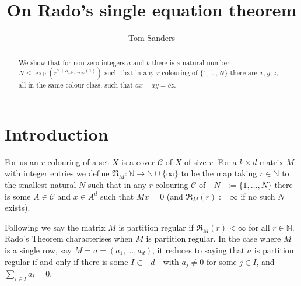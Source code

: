 \documentclass[12pt,reqno]{amsart}
\providecommand{\N}{\mathbb{N}}
\numberwithin{equation}{section}
\begin{document}
\title{On Rado's single equation theorem}

\author{Tom Sanders}
\address{Mathematical Institute\\
University of Oxford\\
Radcliffe Observatory Quarter\\
Woodstock Road\\
Oxford OX2 6GG\\
United Kingdom}

\begin{abstract}
We show that for non-zero integers $a$ and $b$ there is a natural number $N \leq \exp(r^{2+o_{a,b;r\rightarrow \infty}(1)})$ such that in any $r$-colouring of $\{1,\dots,N\}$ there are $x,y,z$, all in the same colour class, such that $ax-ay=bz$. 
\end{abstract}

\maketitle

\section{Introduction}\label{sec.intro}

For us an $r$-colouring of a set $X$ is a cover $\mathcal{C}$ of $X$ of size $r$.  For a $k \times d$ matrix $M$ with integer entries we define $\mathfrak{R}_M:\N \rightarrow \N \cup \{\infty\}$ to be the map taking $r \in \N$ to the smallest natural $N$ such that in any $r$-colouring $\mathcal{C}$ of $[N]:=\{1,\dots,N\}$ there is some $A \in \mathcal{C}$ and $x \in A^d$ such that $Mx=0$ (and $\mathfrak{R}_M(r):=\infty$ if no such $N$ exists).

Following \cite[p425]{rad::1} we say the matrix $M$ is partition regular if $\mathfrak{R}_M(r)<\infty$ for all $r \in \N$. Rado's Theorem \cite[Satz IV, p445]{rad::1} characterises when $M$ is partition regular. In the case where $M$ is a single row, say $M=a=(a_1,\dots,a_d)$, it reduces \cite[p446]{rad::1} to saying that $a$ is partition regular if and only if there is some $I \subset [d]$ with $a_j \neq 0$ for some $j \in I$, and $\sum_{i \in I}{a_i}=0$.
\end{document}
